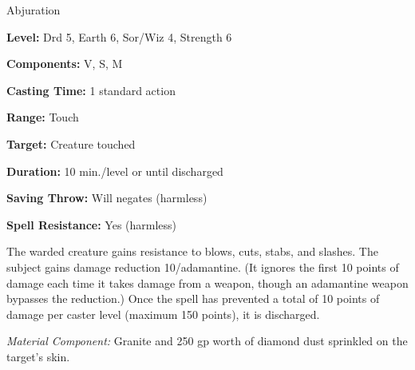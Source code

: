
Abjuration

\textbf{Level:} Drd 5, Earth 6, Sor/Wiz 4, Strength 6

\textbf{Components:} V, S, M

\textbf{Casting Time:} 1 standard action

\textbf{Range:} Touch

\textbf{Target:} Creature touched

\textbf{Duration:} 10 min./level or until discharged

\textbf{Saving Throw:} Will negates (harmless)

\textbf{Spell Resistance:} Yes (harmless)

The warded creature gains resistance to blows, cuts, stabs, and slashes. The subject 
gains damage reduction 10/adamantine. (It ignores the first 10 points of damage 
each time it takes damage from a weapon, though an adamantine weapon bypasses the 
reduction.) Once the spell has prevented a total of 10 points of damage per caster 
level (maximum 150 points), it is discharged.

\textit{Material Component:} Granite and 250 gp worth of diamond dust sprinkled 
on the target's skin.

